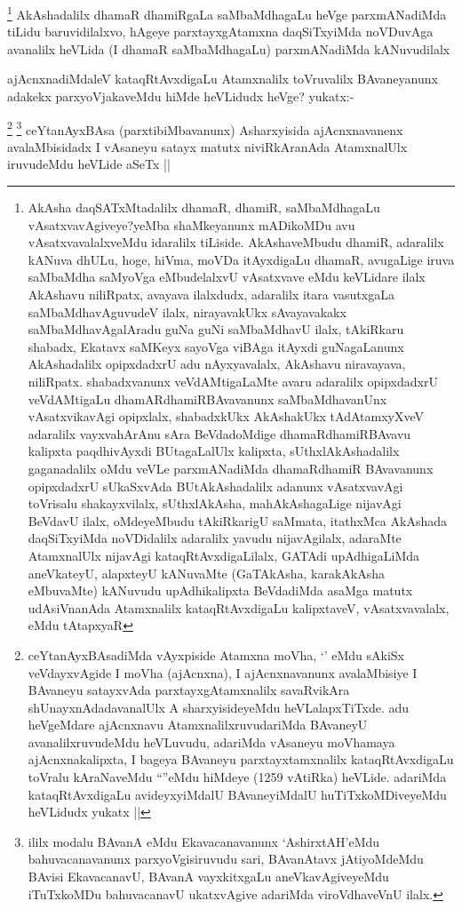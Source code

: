 \begin{artha}
\footnote{AkAsha daqSATxMtadalilx dhamaR, dhamiR, saMbaMdhagaLu vAsatxvavAgiveye?yeMba shaMkeyanunx mADikoMDu avu vAsatxvavalalxveMdu idaralilx tiLiside. AkAshaveMbudu dhamiR, adaralilx kANuva dhULu, hoge, hiVma, moVDa itAyxdigaLu dhamaR, avugaLige iruva saMbaMdha saMyoVga eMbudelalxvU vAsatxvave eMdu keVLidare ilalx AkAshavu niliRpatx, avayava ilalxdudx, adaralilx itara vasutxgaLa saMbaMdhavAguvudeV ilalx, nirayavakUkx sAvayavakakx saMbaMdhavAgalAradu guNa guNi saMbaMdhavU ilalx, tAkiRkaru shabadx, Ekatavx saMKeyx sayoVga viBAga itAyxdi guNagaLanunx AkAshadalilx opipxdadxrU adu nAyxyavalalx, AkAshavu niravayava, niliRpatx. shabadxvanunx veVdAMtigaLaMte avaru adaralilx opipxdadxrU veVdAMtigaLu dhamARdhamiRBAvavanunx saMbaMdhavanUnx vAsatxvikavAgi opipxlalx, shabadxkUkx AkAshakUkx tAdAtamxyXveV adaralilx vayxvahArAnu sAra BeVdadoMdige dhamaRdhamiRBAvavu kalipxta paqdhivAyxdi BUtagaLalUlx kalipxta, sUthxlAkAshadalilx gaganadalilx oMdu veVLe parxmANadiMda dhamaRdhamiR BAvavanunx opipxdadxrU sUkaSxvAda BUtAkAshadalilx adanunx vAsatxvavAgi toVrisalu shakayxvilalx, sUthxlAkAsha, mahAkAshagaLige nijavAgi BeVdavU ilalx, oMdeyeMbudu tAkiRkarigU saMmata, itathxMca AkAshada daqSiTxyiMda noVDidalilx adaralilx yavudu nijavAgilalx, adaraMte AtamxnalUlx nijavAgi kataqRtAvxdigaLilalx, GATAdi upAdhigaLiMda aneVkateyU, alapxteyU kANuvaMte (GaTAkAsha, karakAkAsha eMbuvaMte) kANuvudu upAdhikalipxta BeVdadiMda asaMga matutx udAsiVnanAda Atamxnalilx kataqRtAvxdigaLu kalipxtaveV, vAsatxvavalalx, eMdu tAtapxyaR }
AkAshadalilx dhamaR dhamiRgaLa saMbaMdhagaLu heVge parxmANadiMda tiLidu baruvidilalxvo, hAgeye parxtayxgAtamxna daqSiTxyiMda noVDuvAga avanalilx heVLida (I dhamaR saMbaMdhagaLu) parxmANadiMda kANuvudilalx
\end{artha}

\begin{artha}
ajAcnxnadiMdaleV kataqRtAvxdigaLu Atamxnalilx toVruvalilx BAvaneyanunx adakekx parxyoVjakaveMdu hiMde heVLidudx heVge? yukatx:-
\end{artha}

\begin{artha}
\footnote{ceYtanAyxBAsadiMda vAyxpiside Atamxna moVha, `\stext' eMdu sAkiSx veVdayxvAgide I moVha (ajAcnxna), I ajAcnxnavanunx avalaMbisiye I BAvaneyu satayxvAda parxtayxgAtamxnalilx savaRvikAra shUnayxnAdadavanalUlx A sharxyisideyeMdu heVLalapxTiTxde. adu heVgeMdare ajAcnxnavu AtamxnalilxruvudariMda BAvaneyU avanalilxruvudeMdu heVLuvudu, adariMda vAsaneyu moVhamaya ajAcnxnakalipxta, I bageya BAvaneyu parxtayxtamxnalilx kataqRtAvxdigaLu toVralu kAraNaveMdu ``\stext''eMdu hiMdeye (1259 vAtiRka) heVLide. adariMda kataqRtAvxdigaLu avideyxyiMdalU BAvaneyiMdalU huTiTxkoMDiveyeMdu heVLidudx yukatx ||}
\footnote{ililx modalu BAvanA eMdu Ekavacanavanunx `AshirxtAH'eMdu bahuvacanavanunx parxyoVgisiruvudu sari, BAvanAtavx jAtiyoMdeMdu BAvisi EkavacanavU, BAvanA vayxkitxgaLu aneVkavAgiveyeMdu iTuTxkoMDu bahuvacanavU ukatxvAgive adariMda viroVdhaveVnU ilalx.}
ceYtanAyxBAsa (parxtibiMbavanunx) Asharxyisida ajAcnxnavanenx avalaMbisidadx I vAsaneyu satayx matutx niviRkAranAda AtamxnalUlx iruvudeMdu heVLide aSeTx ||
\end{artha}


